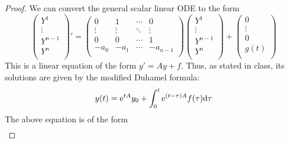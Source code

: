 \documentclass[../psets.tex]{subfiles}
\begin{document}
\begin{enumerate}
\begin{proof}
        
        We can convert the general scalar linear ODE to the form
        \begin{equation*}
            \begin{pmatrix}
                Y^1\\
                \vdots\\
                Y^{n-1}\\
                Y^n\\
            \end{pmatrix}'
            =
            \begin{pmatrix}
                0 & 1 & \cdots & 0\\
                \vdots & \vdots & \ddots & \vdots\\
                0 & 0 & \cdots & 1\\
                -a_0 & -a_1 & \cdots & -a_{n-1}\\
            \end{pmatrix}
            \begin{pmatrix}
                Y^1\\
                \vdots\\
                Y^{n-1}\\
                Y^n\\
            \end{pmatrix}
            +
            \begin{pmatrix}
                0\\
                \vdots\\
                0\\
                g(t)\\
            \end{pmatrix}
        \end{equation*}
        This is a linear equation of the form $y'=Ay+f$. Thus, as stated in class, its solutions are given by the modified Duhamel formula:
        \begin{equation*}
            y(t) = \e[tA]y_0+\int_0^t\e[(t-\tau)A]f(\tau)\dd\tau
        \end{equation*}
        The above equation is of the form
        \begin{align*}

\end{align*}
\end{proof}
\end{enumerate}
\end{document}
